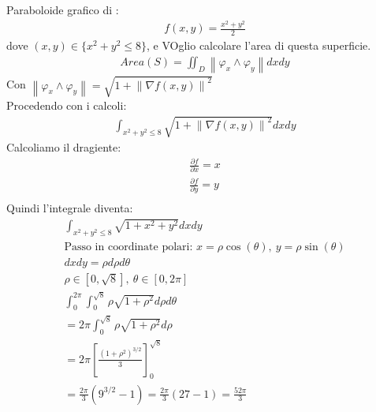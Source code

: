 \documentclass[a4paper, oneside]{article}
\begin{document}
\begin{example}
  Paraboloide grafico di :
  \begin{gather*}
    f(x,y) = \frac{x^2+y^2}{2}
  \end{gather*}
  dove $(x,y) \in \{x^2+y^2 \leq 8\}$, e VOglio calcolare l'area di questa superficie.
  \begin{gather*}
    Area(S) = \iint_D \left\lVert \varphi_x \land \varphi_y \right\rVert dxdy
  \end{gather*}
  Con $\left\lVert \varphi_x \land \varphi_y \right\rVert = \sqrt{1+ \left\lVert \nabla f(x,y) \right\rVert^2 }$\\
  Procedendo con i calcoli:
  \begin{gather*}
    \int_{x^2+y^2 \leq 8} \sqrt{1 + \left\lVert \nabla f(x,y) \right\rVert^2 } dxdy
  \end{gather*}
  Calcoliamo il dragiente:
  \begin{gather*}
    \frac{\partial f}{\partial x} = x\\
    \frac{\partial f}{\partial y} = y\\
  \end{gather*}
  Quindi l'integrale diventa:
  \begin{gather*}
    \int_{x^2+y^2 \leq 8} \sqrt{1 + x^2 + y^2} dxdy\\
    \text{Passo in coordinate polari: } x = \rho \cos(\theta), \ y = \rho \sin(\theta)\\
    dxdy = \rho d\rho d\theta\\
    \rho \in [0, \sqrt{8}], \ \theta \in [0, 2\pi]\\
    \int_0^{2\pi} \int_0^{\sqrt{8}} \rho \sqrt{1 + \rho^2} d\rho d\theta\\
    = 2\pi \int_0^{\sqrt{8}} \rho \sqrt{1 + \rho^2} d\rho\\
    = 2\pi \left[ \frac{(1+\rho^2)^{3/2}}{3} \right]_0^{\sqrt{8}}\\
    = \frac{2\pi}{3} \left( 9^{3/2} - 1 \right) = \frac{2\pi}{3} (27 - 1) = \frac{52\pi}{3}
  \end{gather*}
\end{example}
\end{document}
